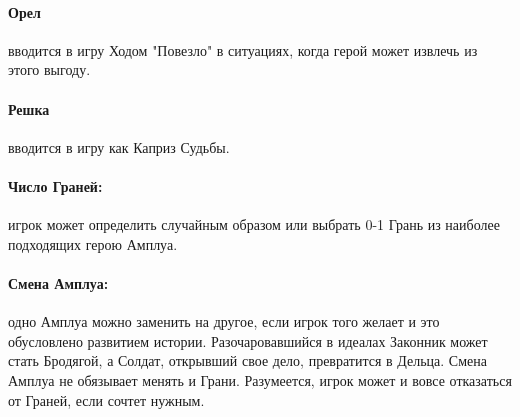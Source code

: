 \paragraph{Орел} вводится в игру Ходом "Повезло" в ситуациях, когда герой может извлечь из этого выгоду. 
\paragraph{Решка} вводится в игру как Каприз Судьбы.
\paragraph{Число Граней:} игрок может определить случайным образом или выбрать 0-1 Грань из наиболее подходящих герою Амплуа. 
\paragraph{Смена Амплуа:} одно Амплуа можно заменить на другое, если игрок того желает и это обусловлено развитием истории. Разочаровавшийся в идеалах Законник может стать Бродягой, а Солдат, открывший свое дело, превратится в Дельца. Смена Амплуа не обязывает менять и Грани. Разумеется, игрок может и вовсе отказаться от Граней, если сочтет нужным.
\newline
{}